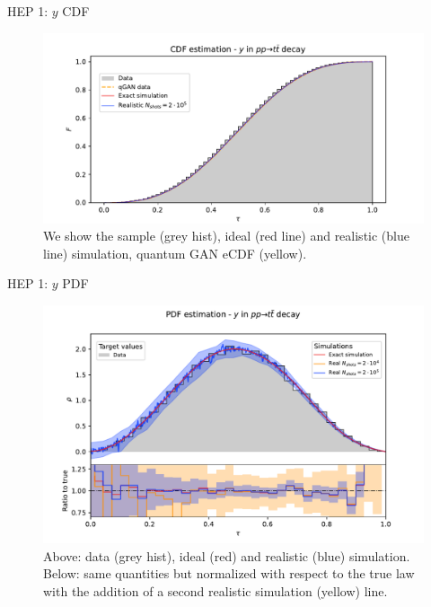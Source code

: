 \documentclass[8pt, xcolor={svgnames}, hyperref={colorlinks, linkcolor=black, citecolor=amethyst, urlcolor=amethyst}]{beamer}
\begin{document}
\begin{frame}[fragile]{HEP 1: $y$ CDF}
\begin{figure}
  \centering
  \includegraphics[width=1\linewidth]{figures/CDF_y_8_20_200000.pdf}
  \caption{We show the sample (grey hist), ideal (red line) and realistic 
  (blue line) simulation, quantum GAN eCDF (yellow).}
\end{figure}
\end{frame}

\begin{frame}[fragile]{HEP 1: $y$ PDF}
\begin{figure}
  \centering
  \includegraphics[width=1\linewidth]{figures/PDF_y_8_20_200000.pdf}
  \caption{Above: data (grey hist), ideal (red) and realistic (blue) simulation. 
  Below: same quantities but normalized
  with respect to the true law with the addition of a second realistic simulation
  (yellow) line.}
\end{figure}
\end{frame}
\end{document}
